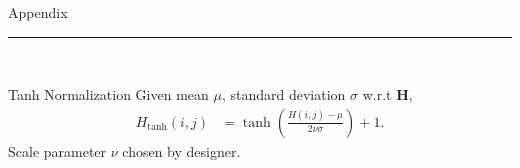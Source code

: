 \documentclass{beamer}
\begin{document}
  \begin{frame}[plain]
    \vfill
    \centering
    \begin{beamercolorbox}[sep=8pt,center,shadow=true,rounded=true]{Appendix}
      \insertsectionhead\par%
      \color{davisblue}\noindent\rule{10cm}{1pt} \\
    \end{beamercolorbox}
    \vfill
  \end{frame} 



  \begin{frame}{Tanh Normalization}
    Given mean $\mu$, standard deviation $\sigma$ w.r.t $\mathbf H$,
    \begin{align*} 
      H_{\tanh}(i,j) &= \tanh\left(\frac{H(i,j) - \mu}{2\nu\sigma}\right) + 1.
    \end{align*}
    Scale parameter $\nu$ chosen by designer.
  \end{frame}
\end{document}
